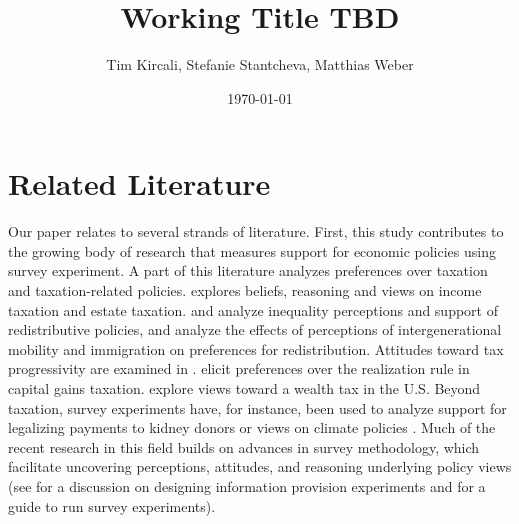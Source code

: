 \documentclass[12pt]{article}
\title{\textbf{\large{Working Title TBD}}}
\author{\normalsize{Tim Kircali, Stefanie Stantcheva, Matthias Weber}}
\date{\normalsize{\today}}
\begin{document}
\maketitle
{}
\section*{Related Literature}



Our paper relates to several strands of literature. First, this study contributes to the growing body of research that measures support for economic policies using survey experiment. A part of this literature analyzes preferences over taxation and taxation-related policies. \textcite{stantcheva2021understanding} explores beliefs, reasoning and views on income taxation and estate taxation. \textcite{cruces2013biased} and \textcite{kuziemko2015elastic} analyze inequality perceptions and support of redistributive policies, \textcite{alesina2018intergenerational} and \textcite{alesina2023immigration} analyze the effects of perceptions of intergenerational mobility and immigration on preferences for redistribution. Attitudes toward tax progressivity are examined in \textcite{tarroux2019value}. \textcite{liscow2022psychology} elicit preferences over the realization rule in capital gains taxation. \textcite{fisman2020americans} explore views toward a wealth tax in the U.S. Beyond taxation, survey experiments have, for instance, been used to analyze support for legalizing payments to kidney donors \parencite{elias2019paying} or views on climate policies \parencite{dechezlepretre2025fighting}. Much of the recent research in this field builds on advances in survey methodology, which facilitate uncovering perceptions, attitudes, and reasoning underlying policy views (see \textcite{haaland2023designing} for a discussion on designing information provision experiments and \textcite{stantcheva2023run} for a guide to run survey experiments). 
\end{document}
